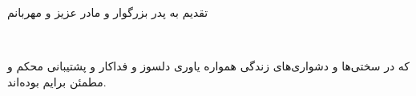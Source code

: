 \begin{acknowledgementpage}

\vspace{1.5cm}

{\large\nastaliq
{
{\par \noindent
تقدیم به پدر بزرگوار و مادر عزیز و مهربانم}
\\[0.1cm]
{\par \noindent
که در سختی‌ها و دشوار‌ی‌های زندگی همواره یاوری دلسوز و فداکار
و پشتیبانی محکم و مطمئن برایم بوده‌اند.
}
}
}

\end{acknowledgementpage}
\newpage